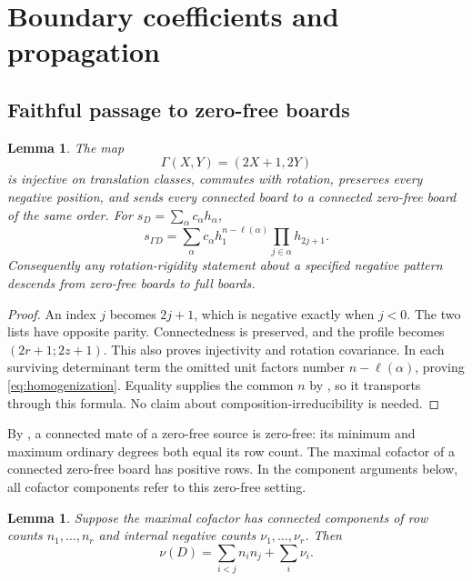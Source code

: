 \documentclass[11pt,a4paper]{amsart}
\numberwithin{equation}{section}
\theoremstyle{plain}
\newtheorem{lemma}[theorem]{Lemma}
\theoremstyle{definition}
\begin{document}
\section{Boundary coefficients and propagation}\label{sec:boundary-tools}

\subsection{Faithful passage to zero-free boards}

\begin{lemma}\label{lem:homogenization}
The map
\begin{equation}\label{eq:gamma}
 \Gamma(X,Y)=(2X+1,2Y)
\end{equation}
is injective on translation classes, commutes with rotation, preserves
every negative position, and sends every connected board to a connected
zero-free board of the same order.  For \(s_D=\sum_\alpha c_\alpha h_\alpha\),
\begin{equation}\label{eq:homogenization}
 s_{\Gamma D}=\sum_\alpha c_\alpha h_1^{n-\ell(\alpha)}
                         \prod_{j\in\alpha}h_{2j+1}.
\end{equation}
Consequently any rotation-rigidity statement about a specified negative
pattern descends from zero-free boards to full boards.
\end{lemma}

\begin{proof}
An index \(j\) becomes \(2j+1\), which is negative exactly when \(j<0\).
The two lists have opposite parity.  Connectedness is preserved, and the
profile becomes \((2r+1;2z+1)\).  This also proves injectivity and rotation
covariance.  In each surviving determinant term the omitted unit factors
number \(n-\ell(\alpha)\), proving \eqref{eq:homogenization}.
Equality supplies the common \(n\) by , so it transports
through this formula.  No claim about composition-irreducibility is needed.
\end{proof}

By , a connected mate of a zero-free source
is zero-free: its minimum and maximum ordinary degrees both equal
its row count.  The maximal cofactor of a connected zero-free board
has positive rows.  In the component arguments below, all cofactor
components refer to this zero-free setting.

\begin{lemma}\label{lem:component-budget}
Suppose the maximal cofactor has connected components of row counts \(n_1,\ldots,n_r\) and internal negative counts \(\nu_1,\ldots,\nu_r\).  Then
\begin{equation}\label{eq:component-budget}
 \nu(D)=\sum_{i<j}n_i n_j+\sum_i\nu_i.
\end{equation}
\end{lemma}
\end{document}
